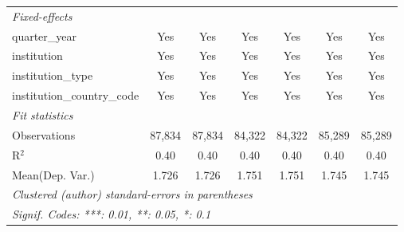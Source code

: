 \begin{tabular}{lcccccc}
   \midrule
   \emph{Fixed-effects}\\
   quarter\_year                      & Yes     & Yes         & Yes     & Yes      & Yes     & Yes\\  
   institution                        & Yes     & Yes         & Yes     & Yes      & Yes     & Yes\\  
   institution\_type                  & Yes     & Yes         & Yes     & Yes      & Yes     & Yes\\  
   institution\_country\_code         & Yes     & Yes         & Yes     & Yes      & Yes     & Yes\\  
   \midrule
   \emph{Fit statistics}\\
   Observations                       & 87,834  & 87,834      & 84,322  & 84,322   & 85,289  & 85,289\\  
   R$^2$                              & 0.40    & 0.40        & 0.40    & 0.40     & 0.40    & 0.40\\  
Mean(Dep. Var.) & 1.726 & 1.726 & 1.751 & 1.751 & 1.745 & 1.745 \\
   \midrule \midrule
   \multicolumn{7}{l}{\emph{Clustered (author) standard-errors in parentheses}}\\
   \multicolumn{7}{l}{\emph{Signif. Codes: ***: 0.01, **: 0.05, *: 0.1}}\\
\end{tabular}
\par\endgroup
